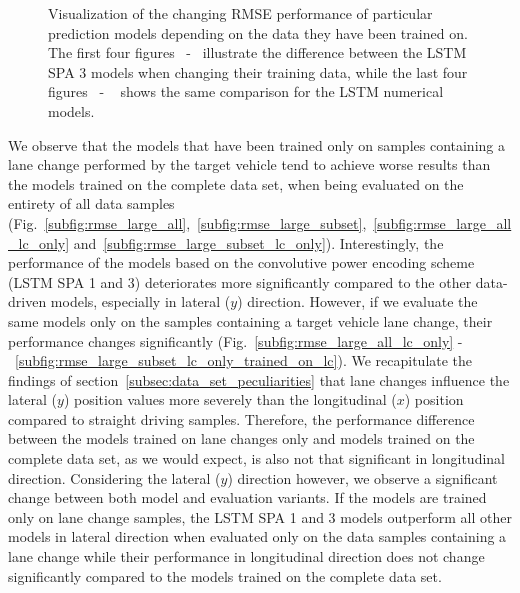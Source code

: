 \begin{figure}[t!]
{    }
    \caption{Visualization of the changing \ac{RMSE} performance of particular prediction models depending on the data they have been trained on.
        The first four figures~\protect{} -~\protect{} illustrate the difference between the \ac{LSTM} \acs{SPA} \num{3} models when changing their training data, while the last four figures~\protect{} -
        ~\protect{} shows the same comparison for the \ac{LSTM} numerical models.
    }
    \label{fig:rmse_on_board_training_all_vs_training_on_lc_only}
\end{figure}

We observe that the models that have been trained only on samples containing a lane change performed by the target vehicle tend to achieve worse results than the models trained on the complete data set, when being evaluated on the entirety of all data samples (Fig.~\ref{subfig:rmse_large_all},~\ref{subfig:rmse_large_subset},~\ref{subfig:rmse_large_all_lc_only} and~\ref{subfig:rmse_large_subset_lc_only}).
Interestingly, the performance of the models based on the convolutive power encoding scheme (\acs{LSTM} \acs{SPA} \num{1} and \num{3}) deteriorates more significantly compared to the other data-driven models, especially in lateral ($y$) direction.
However, if we evaluate the same models only on the samples containing a target vehicle lane change, their performance changes significantly (Fig.~\ref{subfig:rmse_large_all_lc_only} -~\ref{subfig:rmse_large_subset_lc_only_trained_on_lc}).
We recapitulate the findings of section~\ref{subsec:data_set_peculiarities} that lane changes influence the lateral ($y$) position values more severely than the longitudinal ($x$) position compared to straight driving samples.
Therefore, the performance difference between the models trained on lane changes only and models trained on the complete data set, as we would expect, is also not that significant in longitudinal direction.
Considering the lateral ($y$) direction however, we observe a significant change between both model and evaluation variants.
If the models are trained only on lane change samples, the \ac{LSTM} \acs{SPA} \num{1} and \num{3} models outperform all other models in lateral direction when evaluated only on the data samples containing a lane change while their performance in longitudinal direction does not change significantly compared to the models trained on the complete data set.

